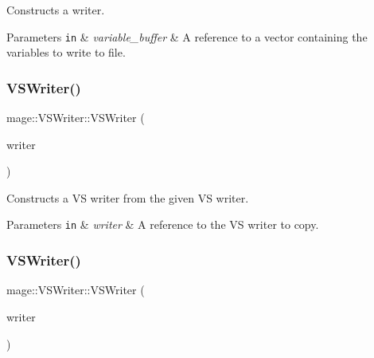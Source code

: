 Constructs a writer.


\begin{DoxyParams}[1]{Parameters}
\mbox{\tt in}  & {\em variable\+\_\+buffer} & A reference to a vector containing the variables to write to file. \\
\hline
\end{DoxyParams}
\hypertarget{classmage_1_1_v_s_writer_a77d146f812d9d37ee99c31133d3597b8}{}\label{classmage_1_1_v_s_writer_a77d146f812d9d37ee99c31133d3597b8} 
\subsubsection{\texorpdfstring{V\+S\+Writer()}{VSWriter()}\hspace{0.1cm}{\footnotesize\ttfamily [2/3]}}
{\footnotesize\ttfamily mage\+::\+V\+S\+Writer\+::\+V\+S\+Writer (\begin{DoxyParamCaption}\item[{const \hyperlink{classmage_1_1_v_s_writer}{V\+S\+Writer} \&}]{writer }\end{DoxyParamCaption})\hspace{0.3cm}{\ttfamily [delete]}}

Constructs a VS writer from the given VS writer.


\begin{DoxyParams}[1]{Parameters}
\mbox{\tt in}  & {\em writer} & A reference to the VS writer to copy. \\
\hline
\end{DoxyParams}
\hypertarget{classmage_1_1_v_s_writer_a0e35e2cfa8142ba4176c6259d26ce1b1}{}\label{classmage_1_1_v_s_writer_a0e35e2cfa8142ba4176c6259d26ce1b1} 
\subsubsection{\texorpdfstring{V\+S\+Writer()}{VSWriter()}\hspace{0.1cm}{\footnotesize\ttfamily [3/3]}}
{\footnotesize\ttfamily mage\+::\+V\+S\+Writer\+::\+V\+S\+Writer (\begin{DoxyParamCaption}\item[{\hyperlink{classmage_1_1_v_s_writer}{V\+S\+Writer} \&\&}]{writer }\end{DoxyParamCaption})\hspace{0.3cm}{\ttfamily [delete]}}

